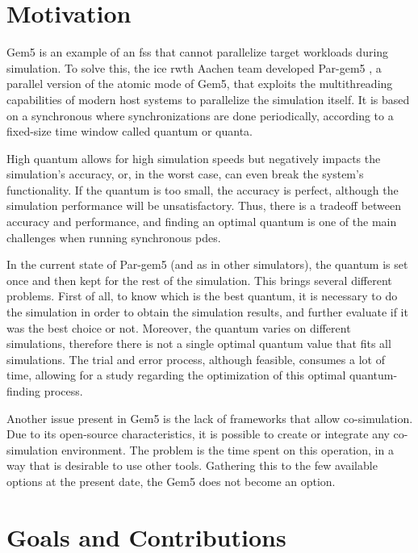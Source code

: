 \section{Motivation}

Gem5 is an example of an \gls{fss} that cannot parallelize target workloads during simulation. To solve this, the \gls{ice} \gls{rwth} Aachen team 
developed Par-gem5 \cite{pargem5}, a parallel version of the atomic mode of Gem5, that exploits the multithreading capabilities of modern host 
systems to parallelize the simulation itself. 
It is based on a synchronous  where synchronizations are done periodically, according to a fixed-size time window called quantum 
or quanta.

High quantum allows for high simulation speeds but negatively impacts the simulation's accuracy, or, in the worst case, can even break the system's 
functionality. If the quantum is too small, the accuracy is perfect, although the simulation performance will be unsatisfactory. Thus, there is a 
tradeoff between accuracy and performance, and finding an optimal quantum is one of the main challenges when running synchronous \gls{pdes}.

In the current state of Par-gem5 (and as in other simulators), the quantum is set once and then kept for the rest of the simulation. This brings 
several different problems. First of all, to know which is the best quantum, it is necessary to do the simulation in order to obtain the simulation 
results, and further evaluate if it was the best choice or not. Moreover, the quantum varies on different simulations, therefore there is not a 
single optimal quantum value that fits all simulations. The trial and error process, although feasible, consumes a lot of time, allowing for a 
study regarding the optimization of this optimal quantum-finding process. 

Another issue present in Gem5 is the lack of frameworks that allow co-simulation. Due to its open-source characteristics, it is possible to 
create or integrate any co-simulation environment. The problem is the time spent on this operation, in a way that is desirable to use other 
tools. Gathering this to the few available options at the present date, the Gem5 does not become an option.

\section{Goals and Contributions}

